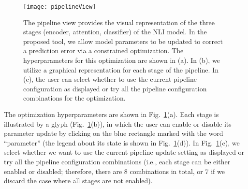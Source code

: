 \begin{figure}[htbp]
\centering
\vspace{-2mm}
 \texttt{[image: pipelineView]}
 \vspace{-2mm}
 \caption{
The pipeline view provides the visual representation of the three stages (encoder, attention, classifier) of the NLI model. 
%
In the proposed tool, we allow model parameters to be updated to correct a prediction error via a constrained optimization.
The hyperparameters for this optimization are shown in (a). 
In (b), we utilize a graphical representation for each stage of the pipeline.
In (c), the user can select whether to use the current pipeline configuration as displayed or try all the pipeline configuration combinations for the optimization. %
}
\label{fig:pipelineView}
\vspace{-2mm}
\end{figure}

The optimization hyperparameters are shown in Fig.~\ref{fig:pipelineView}(a). Each stage is illustrated by a glyph (Fig.~\ref{fig:pipelineView}(b)), in which the user can enable or disable its parameter update by clicking on the blue rectangle marked with the word ``parameter'' (the legend about its state is shown in Fig.~\ref{fig:pipelineView}(d)). In Fig.~\ref{fig:pipelineView}(c), we select whether we want to use the current pipeline update setting as displayed or try all the pipeline configuration combinations (i.e., each stage can be either enabled or disabled; therefore, there are $8$ combinations in total, or $7$ if we discard the case where all stages are not enabled).



